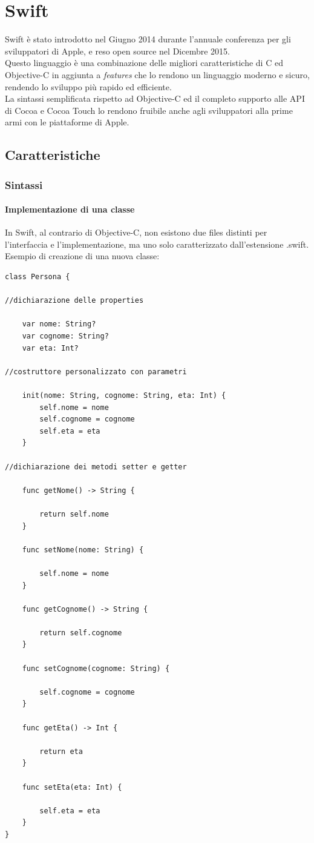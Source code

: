 \chapter{Swift}
Swift è stato introdotto nel Giugno 2014 durante l'annuale conferenza per gli sviluppatori di Apple, e reso open source nel Dicembre 2015.\\
Questo linguaggio è una combinazione delle migliori caratteristiche di C ed Objective-C in aggiunta a \textit{features} che lo rendono un linguaggio moderno e sicuro, rendendo lo sviluppo più rapido ed efficiente.\\La sintassi semplificata rispetto ad Objective-C ed il completo supporto alle API di Cocoa e Cocoa Touch lo rendono fruibile anche agli sviluppatori alla prime armi con le piattaforme di Apple.
\section{Caratteristiche}
\subsection{Sintassi}
\subsubsection{Implementazione di una classe}
In Swift, al contrario di Objective-C, non esistono due files distinti per l'interfaccia e l'implementazione, ma uno solo caratterizzato dall'estensione .swift.\\
Esempio di creazione di una nuova classe:\\
\lstset{language=[Objective]C, breakindent=40pt, breaklines}
\begin{lstlisting}
class Persona { 

//dichiarazione delle properties

	var nome: String? 
	var cognome: String? 
	var eta: Int?

//costruttore personalizzato con parametri 

	init(nome: String, cognome: String, eta: Int) {
		self.nome = nome
		self.cognome = cognome
		self.eta = eta
	}

//dichiarazione dei metodi setter e getter 

	func getNome() -> String {

		return self.nome
	}

	func setNome(nome: String) {

		self.nome = nome
	}

	func getCognome() -> String {

		return self.cognome
	}

	func setCognome(cognome: String) {
	
		self.cognome = cognome
	}

	func getEta() -> Int {
	
		return eta
	}

	func setEta(eta: Int) {

		self.eta = eta
	}
}
\end{lstlisting}
